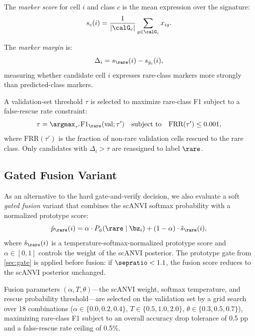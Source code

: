 The \emph{marker score} for cell $i$ and class $c$ is the mean expression over the signature:
\begin{equation}
    s_c(i) = \frac{1}{|\calG_c|}\sum_{g \in \calG_c} x_{ig}.
    \label{eq:marker_score}
\end{equation}

The \emph{marker margin} is:
\begin{equation}
    \Delta_i = s_\rare(i) - s_{\hat{y}_i}(i),
    \label{eq:marker_margin}
\end{equation}
measuring whether candidate cell $i$ expresses rare-class markers more strongly than predicted-class markers.

A validation-set threshold $\tau$ is selected to maximize rare-class F1 subject to a false-rescue rate constraint:
\begin{equation}
    \tau = \argmax_{\tau'} \text{F1}_\rare(\text{val};\tau') \quad \text{subject to} \quad \text{FRR}(\tau') \leq 0.001,
    \label{eq:threshold}
\end{equation}
where $\text{FRR}(\tau')$ is the fraction of non-rare validation cells rescued to the rare class. Only candidates with $\Delta_i > \tau$ are reassigned to label $\rare$.

\subsection{Gated Fusion Variant}
\label{sec:fusion}

As an alternative to the hard gate-and-verify decision, we also evaluate a soft \emph{gated fusion} variant that combines the scANVI softmax probability with a normalized prototype score:
\begin{equation}
    \tilde{p}_\rare(i) = \alpha \cdot P_\phi(\rare \mid \bz_i) + (1-\alpha) \cdot \hat{s}_\rare(i),
    \label{eq:fusion}
\end{equation}
where $\hat{s}_\rare(i)$ is a temperature-softmax-normalized prototype score and $\alpha \in [0,1]$ controls the weight of the scANVI posterior. The prototype gate from \cref{sec:gate} is applied before fusion: if $\sepratio < 1.1$, the fusion score reduces to the scANVI posterior unchanged.

Fusion parameters $(\alpha, T, \theta)$---the scANVI weight, softmax temperature, and rescue probability threshold---are selected on the validation set by a grid search over 18 combinations ($\alpha \in \{0.0, 0.2, 0.4\}$, $T \in \{0.5, 1.0, 2.0\}$, $\theta \in \{0.3, 0.5, 0.7\}$), maximizing rare-class F1 subject to an overall accuracy drop tolerance of 0.5 pp and a false-rescue rate ceiling of 0.5\%.

